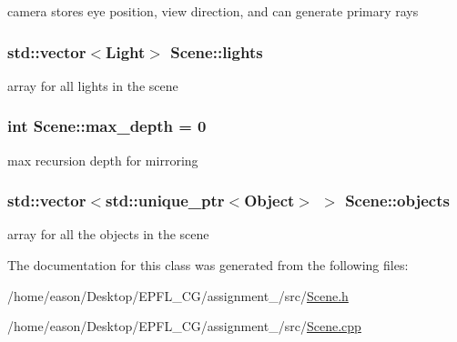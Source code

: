 camera stores eye position, view direction, and can generate primary rays 

\subsubsection[{\texorpdfstring{lights}{lights}}]{\setlength{\rightskip}{0pt plus 5cm}std\+::vector$<${\bf Light}$>$ Scene\+::lights\hspace{0.3cm}{\ttfamily [private]}}\hypertarget{classScene_ab3625e4ac3c6e47156edd23e2421e828}{}\label{classScene_ab3625e4ac3c6e47156edd23e2421e828}


array for all lights in the scene 

\subsubsection[{\texorpdfstring{max\+\_\+depth}{max_depth}}]{\setlength{\rightskip}{0pt plus 5cm}int Scene\+::max\+\_\+depth = 0\hspace{0.3cm}{\ttfamily [private]}}\hypertarget{classScene_a9150039f4d2c46a617b51c7920142d52}{}\label{classScene_a9150039f4d2c46a617b51c7920142d52}


max recursion depth for mirroring 

\subsubsection[{\texorpdfstring{objects}{objects}}]{\setlength{\rightskip}{0pt plus 5cm}std\+::vector$<$std\+::unique\+\_\+ptr$<${\bf Object}$>$ $>$ Scene\+::objects\hspace{0.3cm}{\ttfamily [private]}}\hypertarget{classScene_abbd6f5b3a4639c3b089037519085bf86}{}\label{classScene_abbd6f5b3a4639c3b089037519085bf86}


array for all the objects in the scene 



The documentation for this class was generated from the following files\+:\begin{DoxyCompactItemize}
\item 
/home/eason/\+Desktop/\+E\+P\+F\+L\+\_\+\+C\+G/assignment\+\_/src/\hyperlink{Scene_8h}{Scene.\+h}\item 
/home/eason/\+Desktop/\+E\+P\+F\+L\+\_\+\+C\+G/assignment\+\_/src/\hyperlink{Scene_8cpp}{Scene.\+cpp}\end{DoxyCompactItemize}
